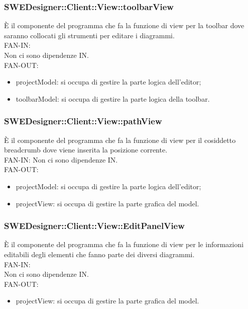 \documentclass[../DefinizioneDiProdotto.tex]{subfiles}
\begin{document}
				\subsubsection{SWEDesigner::Client::View::toolbarView}
				È il componente del programma che fa la funzione di view per la toolbar dove saranno collocati gli strumenti per editare i diagrammi.\\
					FAN-IN:\\
					Non ci sono dipendenze IN.\\
					FAN-OUT:
					\begin{itemize}
						\item projectModel: si occupa di gestire la parte logica dell'editor;
						\item toolbarModel: si occupa di gestire la parte logica della toolbar.
					\end{itemize}

				\subsubsection{SWEDesigner::Client::View::pathView}
				È il componente del programma che fa la funzione di view per il cosiddetto breadcrumb dove viene inserita la posizione corrente.\\
					FAN-IN:
					Non ci sono dipendenze IN. \\
					FAN-OUT:
					\begin{itemize}
						\item projectModel: si occupa di gestire la parte logica dell'editor;
						\item projectView: si occupa di gestire la parte grafica del model.
					\end{itemize}
				
				\subsubsection{SWEDesigner::Client::View::EditPanelView}
				È il componente del programma che fa la funzione di view per le informazioni editabili degli elementi che fanno parte dei diversi diagrammi.\\
					FAN-IN:\\
					Non ci sono dipendenze IN. \\
					FAN-OUT:
					\begin{itemize}
						\item projectView: si occupa di gestire la parte grafica del model.
					\end{itemize}
			
\end{document}
